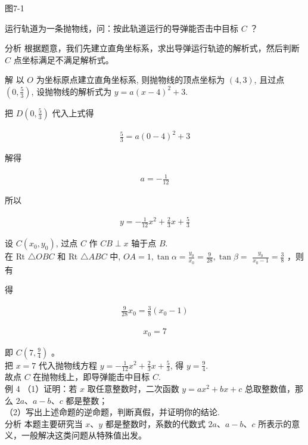 \documentclass[10pt]{article}
\begin{document}
图7-1

运行轨道为一条抛物线，问：按此轨道运行的导弹能否击中目标 $C$ ？

分析 根据题意，我们先建立直角坐标系，求出导弹运行轨迹的解析式，然后判断 $C$ 点坐标满足不满足解析式。

解 以 $O$ 为坐标原点建立直角坐标系, 则抛物线的顶点坐标为 $(4,3)$, 且过点 $\left(0, \frac{5}{3}\right)$, 设抛物线的解析式为 $y=a(x-4)^{2}+3$.

把 $D\left(0, \frac{5}{3}\right)$ 代入上式得

\begin{align*}
\frac{5}{3}=a(0-4)^{2}+3
\end{align*}

解得

\begin{align*}
a=-\frac{1}{12}
\end{align*}

所以

\begin{align*}
y=-\frac{1}{12} x^{2}+\frac{2}{3} x+\frac{5}{3}
\end{align*}

设 $C\left(x_{0}, y_{0}\right)$, 过点 $C$ 作 $C B \perp x$ 轴于点 $B$.\\
在 Rt $\triangle O B C$ 和 Rt $\triangle A B C$ 中, $O A=1, \tan \alpha=\frac{y_{0}}{x_{0}}=\frac{9}{28}, \tan \beta=$ $\frac{y_{0}}{x_{0}-1}=\frac{3}{8}$ ，则有

得

\begin{align*}
\frac{9}{28} x_{0}=\frac{3}{8}\left(x_{0}-1\right)
\end{align*}

\begin{align*}
x_{0}=7
\end{align*}

即 $C\left(7, \frac{9}{4}\right)$ 。\\
把 $x=7$ 代入抛物线方程 $y=-\frac{1}{12} x^{2}+\frac{2}{3} x+\frac{5}{3}$, 得 $y=\frac{9}{4}$.\\
故点 $C$ 在抛物线上，即导弹能击中目标 $C$.\\
例 4 （1）证明：若 $x$ 取任意整数时，二次函数 $y=a x^{2}+b x+c$ 总取整数值，那么 $2 a 、 a-b 、 c$ 都是整数；\\
（2）写出上述命题的逆命题，判断真假，并证明你的结论.\\
分析 本题主要研究当 $x 、 y$ 都是整数时，系数的代数式 $2 a 、 a-b 、 c$ 所表示的意义，一般解决这类问题从特殊值出发。
\end{document}
